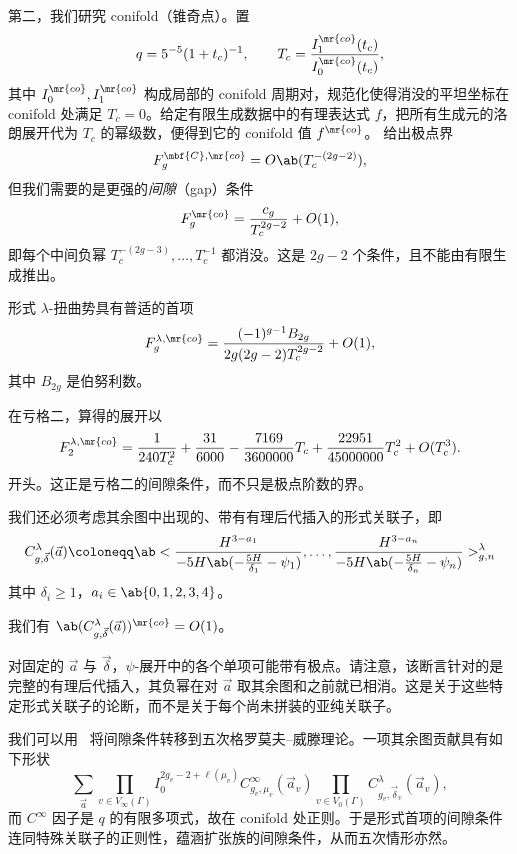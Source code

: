 第二，我们研究 conifold（锥奇点）。置
\[ q = 5^{-5}(1+t_c)^{-1}, \qquad T_c = \frac{I_1^{\mr{co}}(t_c)}{I_0^{\mr{co}}(t_c)}, \]
其中 \(I_0^{\mr{co}}, I_1^{\mr{co}}\) 构成局部的 conifold 周期对，规范化使得消没的平坦坐标在 conifold 处满足 \(T_c = 0\)。给定有限生成数据中的有理表达式 \(f\)，把所有生成元的洛朗展开代为 \(T_c\) 的幂级数，便得到它的 conifold 值 \(f^{\mr{co}}\)。 给出极点界
\[ F_g^{\mbf{C},\mr{co}} = O\ab(T_c^{-(2g-2)}), \]
但我们需要的是更强的\textit{间隙}（gap）条件
\[ F_g^{\mr{co}} = \frac{c_g}{T_c^{2g-2}} + O(1), \]
即每个中间负幂 \(T_c^{-(2g-3)}, \ldots, T_c^{-1}\) 都消没。这是 \(2g-2\) 个条件，且不能由有限生成推出。

\begin{conj}[形式 conifold 间隙]%
\label{conj:formal conifold gap}
    形式 \(\lambda\)-扭曲势具有普适的首项
    \[ F_g^{\lambda,\mr{co}} = \frac{(-1)^{g-1}B_{2g}}{2g(2g-2)T_c^{2g-2}} + O(1), \]
    其中 \(B_{2g}\) 是伯努利数。
\end{conj}

\begin{exm}
    在亏格二，算得的展开以
    \[ F_2^{\lambda,\mr{co}} = \frac{1}{240T_c^2} + \frac{31}{6000} - \frac{7169}{3600000}T_c + \frac{22951}{45000000}T_c^2 + O(T_c^3). \]
    开头。这正是亏格二的间隙条件，而不只是极点阶数的界。
\end{exm}

我们还必须考虑其余图中出现的、带有有理后代插入的形式关联子，即
\[ C^{\lambda}_{g,\vec{\delta}}(\vec{a}) \coloneqq \ab< \frac{H^{3-a_1}}{-5H\ab(-\frac{5H}{\delta_1}-\psi_1)}, \ldots, \frac{H^{3-a_n}}{-5H\ab(-\frac{5H}{\delta_n}-\psi_n)}>^{\lambda}_{g,n} \]
其中 \(\delta_i \geq 1\)，\(a_i \in \ab\{0,1,2,3,4\}\)。

\begin{conj}[特殊插入的正则性]%
\label{conj:special correlator regularity}
    我们有 \(\ab(C^{\lambda}_{g,\vec{\delta}}(\vec{a}))^{\mr{co}} = O(1)\)。
\end{conj}

对固定的 \(\vec{a}\) 与 \(\vec{\delta}\)，\(\psi\)-展开中的各个单项可能带有极点。请注意，该断言针对的是完整的有理后代插入，其负幂在对 \(\vec{a}\) 取其余图和之前就已相消。这是关于这些特定形式关联子的论断，而不是关于每个尚未拼装的亚纯关联子。

我们可以用~ 将间隙条件转移到五次格罗莫夫–威滕理论。一项其余图贡献具有如下形状
\[ \sum_{\vec{a}} \prod_{v \in V_{\infty}(\Gamma)}I_0^{2g_v-2+\ell(\mu_v)}C^{\infty}_{g_v,\mu_v}(\vec{a}_v)\prod_{v\in V_0(\Gamma)}C^{\lambda}_{g_v,\vec{\delta}_v}(\vec{a}_v), \]
而 \(C^{\infty}\) 因子是 \(q\) 的有限多项式，故在 conifold 处正则。于是形式首项的间隙条件连同特殊关联子的正则性，蕴涵扩张族的间隙条件，从而五次情形亦然。

